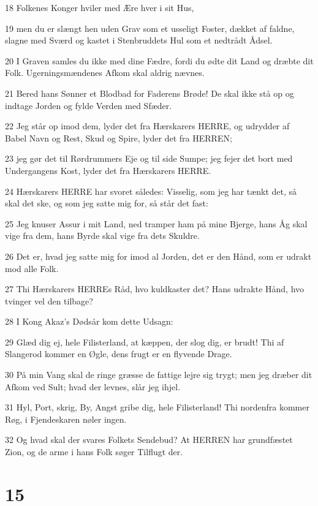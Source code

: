 \par 18 Folkenes Konger hviler med Ære hver i sit Hus,
\par 19 men du er slængt hen uden Grav som et usseligt Foster, dækket af faldne, slagne med Sværd og kastet i Stenbruddets Hul som et nedtrådt Ådsel.
\par 20 I Graven samles du ikke med dine Fædre, fordi du ødte dit Land og dræbte dit Folk. Ugerningsmændenes Afkom skal aldrig nævnes.
\par 21 Bered hans Sønner et Blodbad for Faderens Brøde! De skal ikke stå op og indtage Jorden og fylde Verden med Sfæder.
\par 22 Jeg står op imod dem, lyder det fra Hærskarers HERRE, og udrydder af Babel Navn og Rest, Skud og Spire, lyder det fra HERREN;
\par 23 jeg gør det til Rørdrummers Eje og til side Sumpe; jeg fejer det bort med Undergangens Kost, lyder det fra Hærskarers HERRE.
\par 24 Hærskarers HERRE har svoret således: Visselig, som jeg har tænkt det, så skal det ske, og som jeg satte mig for, så står det fast:
\par 25 Jeg knuser Assur i mit Land, ned tramper ham på mine Bjerge, hans Åg skal vige fra dem, hans Byrde skal vige fra dets Skuldre.
\par 26 Det er, hvad jeg satte mig for imod al Jorden, det er den Hånd, som er udrakt mod alle Folk.
\par 27 Thi Hærskarers HERREs Råd, hvo kuldkaster det? Hans udrakte Hånd, hvo tvinger vel den tilbage?
\par 28 I Kong Akaz's Dødsår kom dette Udsagn:
\par 29 Glæd dig ej, hele Filisterland, at kæppen, der slog dig, er brudt! Thi af Slangerod kommer en Øgle, dens frugt er en flyvende Drage.
\par 30 På min Vang skal de ringe græsse de fattige lejre sig trygt; men jeg dræber dit Afkom ved Sult; hvad der levnes, slår jeg ihjel.
\par 31 Hyl, Port, skrig, By, Angst gribe dig, hele Filisterland! Thi nordenfra kommer Røg, i Fjendeskaren nøler ingen.
\par 32 Og hvad skal der svares Folkets Sendebud? At HERREN har grundfæstet Zion, og de arme i hans Folk søger Tilflugt der.

\chapter{15}

